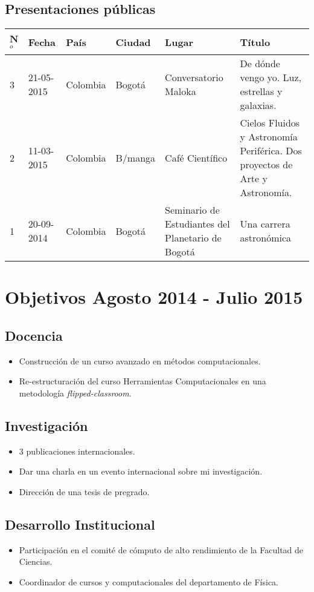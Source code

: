\documentclass{article}
\begin{document}
\subsection{Presentaciones p\'ublicas}

\begin{tabular}{l l l l p{3cm} p{4cm}}\hline
N$^{o}$ & Fecha & Pa\'is & Ciudad & Lugar & T\'itulo\\\hline
3 & 21-05-2015 & Colombia & Bogot\'a & Conversatorio Maloka & De d\'onde vengo yo. Luz, estrellas y galaxias.\\
2 & 11-03-2015 & Colombia & B/manga & Caf\'e Cient\'ifico & Cielos Fluidos y Astronom\'ia Perif\'erica. Dos proyectos de Arte y Astronom\'ia.\\
1 & 20-09-2014 & Colombia & Bogot\'a & Seminario de Estudiantes del
Planetario de Bogot\'a& Una carrera astron\'omica \\\hline
\end{tabular}



\section{Objetivos Agosto 2014 - Julio 2015}


\subsection{Docencia}
\begin{itemize}
\item Construcci\'on de un curso avanzado en m\'etodos computacionales.
\item Re-estructuraci\'on del curso Herramientas Computacionales en
  una metodolog\'ia \emph{flipped-classroom}.
\end{itemize}


\subsection{Investigaci\'on}
\begin{itemize}
\item 3 publicaciones internacionales. 
\item Dar una charla en un evento internacional sobre mi
  investigaci\'on. 
\item Direcci\'on de una tesis de pregrado.
\end{itemize}

\subsection{Desarrollo Institucional}
\begin{itemize}
\item Participaci\'on en el comit\'e  de c\'omputo de alto rendimiento de la
Facultad de Ciencias.
\item Coordinador de cursos y computacionales del departamento de
  F\'isica. 
\end{itemize}
\end{document}
